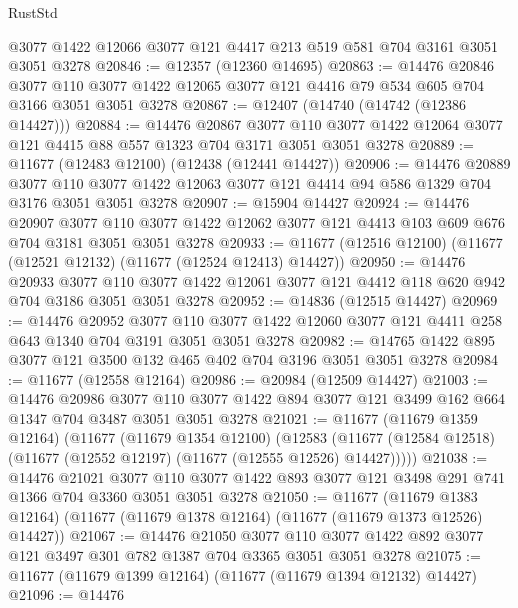 \begin{lexlean}{RustStd}
\begin{coremodule}
    @3077
    @1422
    @12066
    @3077
    @121
    @4417
    @213
    @519
    @581
    @704
    @3161
    @3051
    @3051
    @3278
@20846 := @12357 (@12360 @14695)
@20863 := @14476
    @20846
    @3077
    @110
    @3077
    @1422
    @12065
    @3077
    @121
    @4416
    @79
    @534
    @605
    @704
    @3166
    @3051
    @3051
    @3278
@20867 := @12407 (@14740 (@14742 (@12386 @14427)))
@20884 := @14476
    @20867
    @3077
    @110
    @3077
    @1422
    @12064
    @3077
    @121
    @4415
    @88
    @557
    @1323
    @704
    @3171
    @3051
    @3051
    @3278
@20889 := @11677 (@12483 @12100) (@12438 (@12441 @14427))
@20906 := @14476
    @20889
    @3077
    @110
    @3077
    @1422
    @12063
    @3077
    @121
    @4414
    @94
    @586
    @1329
    @704
    @3176
    @3051
    @3051
    @3278
@20907 := @15904 @14427
@20924 := @14476
    @20907
    @3077
    @110
    @3077
    @1422
    @12062
    @3077
    @121
    @4413
    @103
    @609
    @676
    @704
    @3181
    @3051
    @3051
    @3278
@20933 := @11677 (@12516 @12100) (@11677 (@12521 @12132) (@11677 (@12524 @12413) @14427))
@20950 := @14476
    @20933
    @3077
    @110
    @3077
    @1422
    @12061
    @3077
    @121
    @4412
    @118
    @620
    @942
    @704
    @3186
    @3051
    @3051
    @3278
@20952 := @14836 (@12515 @14427)
@20969 := @14476
    @20952
    @3077
    @110
    @3077
    @1422
    @12060
    @3077
    @121
    @4411
    @258
    @643
    @1340
    @704
    @3191
    @3051
    @3051
    @3278
@20982 := @14765 @1422 @895 @3077 @121 @3500 @132 @465 @402 @704 @3196 @3051 @3051 @3278
@20984 := @11677 (@12558 @12164)
@20986 := @20984 (@12509 @14427)
@21003 := @14476
    @20986
    @3077
    @110
    @3077
    @1422
    @894
    @3077
    @121
    @3499
    @162
    @664
    @1347
    @704
    @3487
    @3051
    @3051
    @3278
@21021 := @11677
    (@11679 @1359 @12164)
    (@11677
      (@11679 @1354 @12100)
      (@12583 (@11677 (@12584 @12518) (@11677 (@12552 @12197) (@11677 (@12555 @12526) @14427)))))
@21038 := @14476
    @21021
    @3077
    @110
    @3077
    @1422
    @893
    @3077
    @121
    @3498
    @291
    @741
    @1366
    @704
    @3360
    @3051
    @3051
    @3278
@21050 := @11677
    (@11679 @1383 @12164)
    (@11677 (@11679 @1378 @12164) (@11677 (@11679 @1373 @12526) @14427))
@21067 := @14476
    @21050
    @3077
    @110
    @3077
    @1422
    @892
    @3077
    @121
    @3497
    @301
    @782
    @1387
    @704
    @3365
    @3051
    @3051
    @3278
@21075 := @11677 (@11679 @1399 @12164) (@11677 (@11679 @1394 @12132) @14427)
@21096 := @14476

\end{coremodule}
\end{lexlean}
